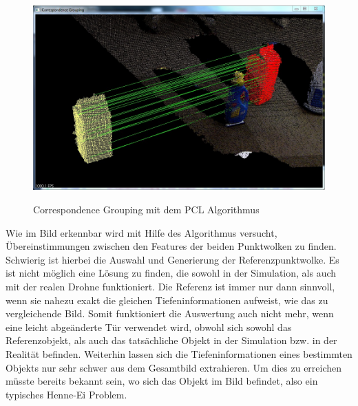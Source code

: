 \begin{figure}[ht]
	\centering
	\includegraphics[scale=0.5]{Bilder/pcl_grouping.jpg}
	\label{fig:pcl_grouping}
	\caption{Correspondence Grouping mit dem PCL Algorithmus  \cite{pclGrouping}}
\end{figure}

Wie im Bild erkennbar wird mit Hilfe des Algorithmus versucht, Übereinstimmungen zwischen den Features der beiden Punktwolken zu finden. \newline
Schwierig ist hierbei die Auswahl und Generierung der Referenzpunktwolke. Es ist nicht möglich eine Lösung zu finden, die sowohl in der Simulation, als auch mit der realen Drohne funktioniert. Die Referenz ist immer nur dann sinnvoll, wenn sie nahezu exakt die gleichen Tiefeninformationen aufweist, wie das zu vergleichende Bild. \newline
Somit funktioniert die Auswertung auch nicht mehr, wenn eine leicht abgeänderte Tür verwendet wird, obwohl sich sowohl das Referenzobjekt, als auch das tatsächliche Objekt in der Simulation bzw. in der Realität befinden.
Weiterhin lassen sich die Tiefeninformationen eines bestimmten Objekts nur sehr schwer aus dem Gesamtbild extrahieren. Um dies zu erreichen müsste bereits bekannt sein, wo sich das Objekt im Bild befindet, also ein typisches Henne-Ei Problem. \newline
